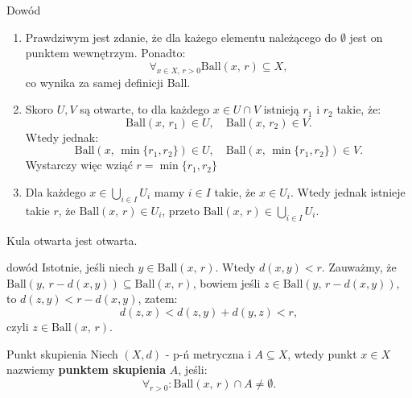 \documentclass{article}
\newcounter{defi}
\numberwithin{defi}{section}
\numberwithin{defi}{section}
\newcommand{\ball}[2]{\text{Ball}(#1, \, #2)}
\begin{document}
\begin{dow}{Dowód}
    \begin{enumerate}
        \item Prawdziwym jest zdanie, że dla każego elementu należącego do $\emptyset$ jest on punktem wewnętrzym. Ponadto: \begin{equation}
                  \forall_{x \in X,\, r > 0} \ball{x}{r} \subseteq X,
              \end{equation}
              co wynika za samej definicji Ball.

        \item Skoro $U, V$ są otwarte, to dla każdego $x \in U \cap V$ istnieją $r_1$ i $r_2$ takie, że:\begin{equation*}
                  \ball{x}{r_1} \in U, \quad \ball{x}{r_2} \in V.
              \end{equation*} Wtedy jednak: \begin{equation*}
                  \ball{x}{\min\{r_1, r_2\}} \in U, \quad \ball{x}{\min\{r_1, r_2\}} \in V.
              \end{equation*} Wystarczy więc wziąć $r = \min\{r_1, r_2\}$

        \item Dla każdego $x \in \bigcup_{i \in I} U_i$ mamy $i \in I$ takie, że $x \in U_i$. Wtedy jednak istnieje takie $r$, że $\ball{x}{r} \in U_i$, przeto $\ball{x}{r} \in \bigcup_{i \in I} U_i$.

    \end{enumerate}

\end{dow}

\begin{twier}{}
    Kula otwarta jest otwarta.
\end{twier}

\begin{dow}{dowód}
    Istotnie, jeśli niech $y \in \ball{x}{r}$. Wtedy $d(x, y) < r$. Zauważmy, że $\ball{y}{r - d(x, y)} \subseteq \ball{x}{r}$, bowiem jeśli $z \in \ball{y}{r - d(x, y)}$, to $d(z, y) < r - d(x, y)$, zatem: \begin{equation*}
        d(z, x) < d(z, y) + d(y, z) < r,
    \end{equation*} czyli $z \in \ball{x}{r}$.
\end{dow}



\begin{defr}{Punkt skupienia}
    Niech $(X, d)$ - p-ń metryczna i $A \subseteq X$, wtedy punkt $x \in X$ nazwiemy \textbf{punktem skupienia} $A$, jeśli: \begin{equation}
        \forall_{r>0}: \ball{x}{r} \cap A \neq \emptyset.
    \end{equation}
\end{defr}
\end{document}
